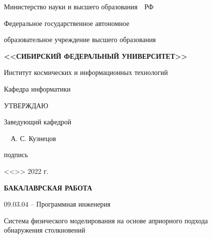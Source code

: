 \begin{spacing}{1}
    \setlength{\parindent}{0cm}

    \centerline{Министерство науки и высшего образования~~РФ}

    \centerline{\small Федеральное государственное автономное}

    \centerline{\small образовательное учреждение высшего образования}

    \centerline{\small\textbf{\MakeUppercase{<<Сибирский Федеральный Университет>>}}}

    \vspace{8pt}

    \centerline{{Институт космических и информационных технологий}}
    
    \vspace{8pt}

    \centerline{{Кафедра информатики}}

    \vspace{10pt}

    \hfill\begin{minipage}{5.5cm}
        УТВЕРЖДАЮ

        Заведующий кафедрой

        \uline{\hfill}~~А. С. Кузнецов

        \vspace{-4pt}
        {\footnotesize \hspace{2.5ex} подпись}

        <<\uline{\hspace{3ex}}>> \uline{\hspace{9ex}} 2022 г.
    \end{minipage}

    \vfill

    \centerline{\bf БАКАЛАВРСКАЯ РАБОТА}
    \vspace{8pt}
    \vspace{8pt}

    \centerline{{09.03.04 -- Программная инженерия}}
    \vspace{10pt}

    \begin{centering}

        {Система физического моделирования на основе априорного подхода}\\
        {обнаружения столкновений}

    \end{centering}

    \vfill
    \vfill
    \vfill


\end{spacing}
